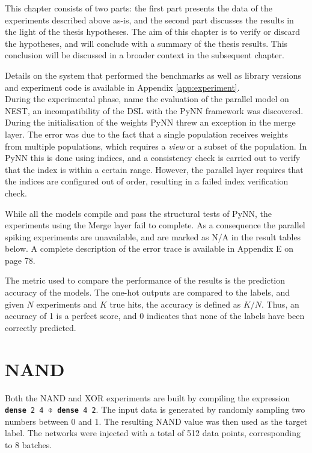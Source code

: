 \documentclass[report.tex]{subfiles}
\begin{document}
This chapter consists of two parts:
the first part presents the data of the experiments described above as-is,
and the second part discusses the results in the light of the thesis hypotheses.
The aim of this chapter is to verify or discard the hypotheses, and will
conclude with a summary of the thesis results.
This conclusion will be discussed in a broader context in the subsequent chapter.

Details on the system that performed the benchmarks as well as
library versions and experiment code is available in Appendix
\ref{app:experiment}.
\\[0.1cm]

During the experimental phase, name the evaluation of the parallel model on
NEST, an incompatibility of the DSL with the PyNN framework was discovered.
During the initialisation of the weights PyNN threw an exception in the 
merge layer.
The error was due to the fact that a single population receives weights
from multiple populations, which requires a \textit{view} or a subset of the
population. 
In PyNN this is done using indices, and a consistency check is carried out to
verify that the index is within a certain range.
However, the parallel layer requires that the indices are configured out of
order, resulting in a failed index verification check.

While all the models compile and pass the structural tests of PyNN,
the experiments using the Merge layer fail to complete.
As a consequence the parallel spiking experiments are unavailable, and are
marked as N/A in the result tables below.
A complete description of the error trace is available in Appendix
E on page 78.

The metric used to compare the performance of the results is the prediction
accuracy of the models. 
The one-hot outputs are compared to the labels, and given $N$ experiments and
$K$ true hits, the accuracy is defined as $K / N$.
Thus, an accuracy of 1 is a perfect score, and 0 indicates that none of the
labels have been correctly predicted.

\section{NAND}
Both the NAND and XOR experiments are built by compiling the expression 
\texttt{\textbf{dense} 2 4 $\obar$ \textbf{dense} 4 2}.
The input data is generated by randomly sampling two numbers between 0 and 1.
The resulting NAND value was then used as the target label.
The networks were injected with a total of 512 data points, corresponding to 8
batches.
\end{document}
